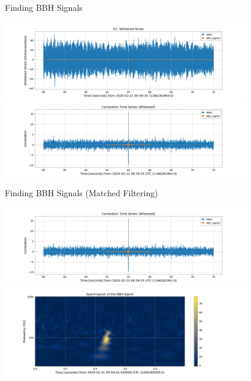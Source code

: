 \documentclass[xcolor=dvipsnames]{beamer}
\begin{document}
\begin{frame}[t]{Finding BBH Signals}
  \begin{center}
    \includegraphics[width=0.8\textwidth]{image/BBH_whiten_ts_H1.png}
    \includegraphics[width=0.8\textwidth]{image/Correlation_ts_H1.png}
  \end{center}
\end{frame}

\begin{frame}[t]{Finding BBH Signals (Matched Filtering)}
  \begin{center}
    \includegraphics[width=0.8\textwidth]{image/Correlation_ts_H1.png}
    \includegraphics[width=0.8\textwidth]{image/Spectrogram_BBH_H1.png}
  \end{center}
\end{frame}
\end{document}
